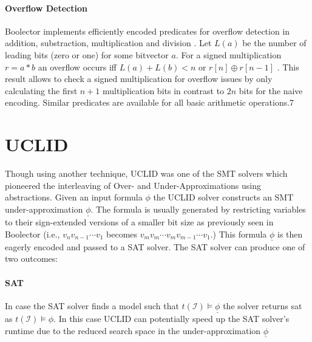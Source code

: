 \paragraph{Overflow Detection}
Boolector implements efficiently encoded predicates for overflow detection in addition, substraction, multiplication and division \cite{Brummayer-PhD}. Let $L\left(a\right)$ be the number of leading bits (zero or one) for some bitvector $a$. For a signed multiplication $r=a*b$ an overflow occurs iff $L\left(a\right) + L\left(b\right) < n$ or $r\left[n\right] \oplus r\left[n-1\right]$ \cite{schulteGokMulOv}. This result allows to check a signed multiplication for overflow issues by only calculating the first $n+1$ multiplication bits in contrast to $2n$ bits for the naive encoding. Similar predicates are available for all basic arithmetic operations.7

\section{UCLID}
Though using another technique, \textsc{UCLID} \cite{Bryant2007_Chapter_DecidingBit-VectorArithmeticWi-UCLID} was one of the SMT solvers which pioneered the interleaving of Over- and Under-Approximations using abstractions. Given an input formula $\phi$ the \textsc{UCLID} solver constructs an SMT under-approximation $\underline{\phi}$. The formula is usually generated by restricting variables to their sign-extended versions of a smaller bit size as previously seen in Boolector (i.e., $v_nv_{n-1}\dotsi v_1$ becomes $v_mv_m\dotsi v_m v_{m-1}\dotsi v_1$.) This formula $\underline{\phi}$ is then eagerly encoded and passed to a SAT solver. The SAT solver can produce one of two outcomes:

\paragraph{SAT} In case the SAT solver finds a model such that $t\left(\mathcal{I}\right)\vDash\underline{\phi}$ the solver returns sat as $t\left(\mathcal{I}\right)\vDash\phi$. In this case \textsc{UCLID} can potentially speed up the SAT solver's runtime due to the reduced search space in the under-approximation $\underline{\phi}$

